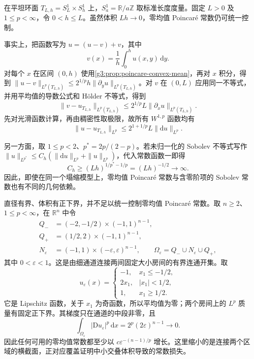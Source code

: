\begin{example}\label{g3:exm:thin-torus-analytic-constants}
	在平坦环面 \(T_{L,h}=S^1_L\times S^1_h\) 上，\(S^1_a=\mathbb R/a\mathbb Z\) 取标准长度度量。固定 \(L>0\) 及 \(1\le p<\infty\)，令 \(0<h\le L\)。虽然体积 \(Lh\to0\)，零均值 Poincaré 常数仍可统一控制。

	事实上，把函数写为 \(u=(u-v)+v\)，其中
	\[
		v(x)=\frac1h\int_0^hu(x,y)\,\mathrm dy.
	\]
	对每个 \(x\) 在区间 \((0,h)\) 使用\cref{g3:prop:poincare-convex-mean}，再对 \(x\) 积分，得到
	\(\|u-v\|_{L^p(T_{L,h})}\le2^{1/p}h\|\partial_yu\|_{L^p(T_{L,h})}\)。对 \(v\) 在 \((0,L)\) 应用同一不等式，并用平均值的导数公式和 Hölder 不等式，得到
	\[
		\|v-u_{T_{L,h}}\|_{L^p(T_{L,h})}
		\le2^{1/p}L\|\partial_xu\|_{L^p(T_{L,h})}.
	\]
	先对光滑函数计算，再由稠密性取极限，故所有 \(W^{1,p}\) 函数均有
	\[
		\|u-u_{T_{L,h}}\|_{L^p}\le2^{1+1/p}L\|\mathrm du\|_{L^p}.
	\]

	另一方面，取 \(1\le p<2\)、\(p^*=2p/(2-p)\)。若未归一化的 Sobolev 不等式写作
	\(\|u\|_{L^{p^*}}\le C_h(\|\mathrm du\|_{L^p}+\|u\|_{L^p})\)，代入常数函数一即得
	\[
		C_h\ge(Lh)^{1/p^*-1/p}=(Lh)^{-1/2}\longrightarrow\infty.
	\]
	因此，即使在同一个塌缩模型上，零均值 Poincaré 常数与含零阶项的 Sobolev 常数也有不同的几何依赖。
\end{example}

\begin{example}\label{g3:exm:thin-neck-poincare}
	直径有界、体积有正下界，并不足以统一控制零均值 Poincaré 常数。取 \(n\ge2\)、\(1\le p<\infty\)，在 \(\mathbb R^n\) 中令
	\[
	\begin{aligned}
		Q_-&=(-2,-1/2)\times(-1,1)^{n-1},\\
		Q_+&=(1/2,2)\times(-1,1)^{n-1},\\
		N_\varepsilon&=(-1,1)\times(-\varepsilon,\varepsilon)^{n-1},
		\qquad\Omega_\varepsilon=Q_-\cup N_\varepsilon\cup Q_+,
	\end{aligned}
	\]
	其中 \(0<\varepsilon<1\)。这是由细通道连接两间固定大小房间的有界连通开集。取
	\[
		u_\varepsilon(x)=\begin{cases}-1,&x_1\le-1/2,\\2x_1,&|x_1|<1/2,\\1,&x_1\ge1/2.\end{cases}
	\]
	它是 Lipschitz 函数，关于 \(x_1\) 为奇函数，所以平均值为零；两个房间上的 \(L^p\) 质量有固定正下界。其梯度只在通道的中段非零，且
	\[
		\int_{\Omega_\varepsilon}|\mathrm D u_\varepsilon|^p\,\mathrm dx
		=2^p(2\varepsilon)^{n-1}\longrightarrow0.
	\]
	因此任何可用的零均值常数都至少以 \(c\varepsilon^{-(n-1)/p}\) 增长。这里缩小的是连接两个区域的横截面，正对应覆盖证明中小交叠体积导致的常数损失。
\end{example}

